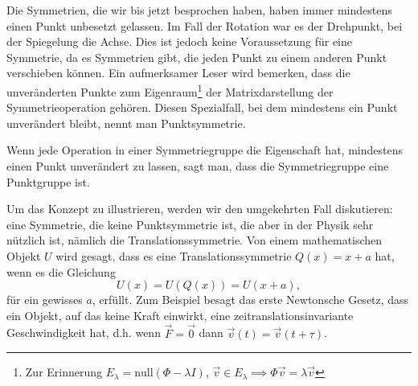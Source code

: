 Die Symmetrien, die wir bis jetzt besprochen haben, haben immer mindestens
einen Punkt unbesetzt gelassen. Im Fall der Rotation war es der Drehpunkt, bei
der Spiegelung die Achse. Dies ist jedoch keine Voraussetzung für eine
Symmetrie, da es Symmetrien gibt, die jeden Punkt zu einem anderen Punkt
verschieben können. Ein aufmerksamer Leser wird bemerken, dass die
unveränderten Punkte zum Eigenraum\footnote{Zur Erinnerung \(E_\lambda =
\mathrm{null}(\Phi - \lambda I)\), \(\vec{v}\in E_\lambda \implies \Phi \vec{v}
= \lambda\vec{v}\)} der Matrixdarstellung der Symmetrieoperation gehören.
Diesen Spezialfall, bei dem mindestens ein Punkt unverändert bleibt, nennt man
Punktsymmetrie.
\begin{definition}[Punktgruppe]
	Wenn jede Operation in einer Symmetriegruppe die Eigenschaft hat, mindestens
	einen Punkt unverändert zu lassen, sagt man, dass die Symmetriegruppe eine
	Punktgruppe ist.
\end{definition}
Um das Konzept zu illustrieren, werden wir den umgekehrten Fall diskutieren:
eine Symmetrie, die keine Punktsymmetrie ist, die aber in der Physik sehr
nützlich ist, nämlich die Translationssymmetrie.  Von einem mathematischen
Objekt \(U\) wird gesagt, dass es eine Translationssymmetrie \(Q(x) = x + a\)
hat, wenn es die Gleichung 
\[
	U(x) = U(Q(x)) = U(x + a),
\]
für ein gewisses \(a\), erfüllt. Zum Beispiel besagt das erste Newtonsche
Gesetz, dass ein Objekt, auf das keine Kraft einwirkt, eine
zeitranslationsinvariante Geschwindigkeit hat, d.h. wenn \(\vec{F} = \vec{0}\)
dann \(\vec{v}(t) = \vec{v}(t + \tau)\).


